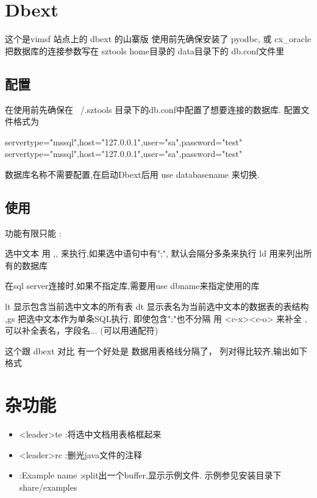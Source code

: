 \documentclass[oneside,openany]{book}
\begin{document}
\section{Dbext}

这个是vimsf 站点上的 dbext 的山寨版
使用前先确保安装了 pyodbc, 或 cx\_oracle 把数据库的连接参数写在 sztools home目录的 data目录下的 db.conf文件里

\subsection{配置}
   在使用前先确保在 ~/.sztools 目录下的db.conf中配置了想要连接的数据库.
   配置文件格式为
    \begin{mdframed}[style=SmallFrame]
    \begin{flushleft}
    servertype="mssql",host="127.0.0.1",user="sa",password="test"\newline
    servertype="mssql",host="127.0.0.1",user="sa",password="test"
    \end{flushleft}
    \end{mdframed}
    数据库名称不需要配置,在启动Dbext后用 use databasename 来切换.

\subsection{使用}
功能有限只能 :

    选中文本
    用 ,, 来执行,如果选中语句中有";", 默认会隔分多条来执行
    ld 用来列出所有的数据库

        在sql server连接时,如果不指定库,需要用use dbname来指定使用的库 

    lt 显示包含当前选中文本的所有表
    dt 显示表名为当前选中文本的数据表的表结构
    ,gs 把选中文本作为单条SQL执行, 即使包含";"也不分隔
    用 <c-x><c-o> 来补全 , 可以补全表名，字段名... (可以用通配符) 

   这个跟 dbext 对比 有一个好处是 数据用表格线分隔了， 列对得比较齐,输出如下格式 

\section{杂功能}
  \begin{itemize}
        \item <leader>te  :将选中文档用表格框起来
        \item <leader>rc  :删光java文件的注释
        \item :Example name  :split出一个buffer,显示示例文件. 示例参见安装目录下share/examples
  \end{itemize}
    
\end{document}
